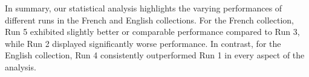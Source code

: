 In summary, our statistical analysis highlights the varying performances of different runs in the French and English collections. 
For the French collection, Run 5 exhibited slightly better or comparable performance compared to Run 3, while Run 2 displayed significantly worse performance. 
In contrast, for the English collection, Run 4 consistently outperformed Run 1 in every aspect of the analysis.

































